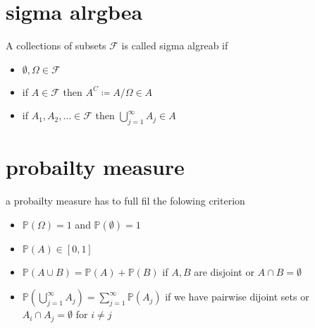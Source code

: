 \section{sigma alrgbea}
A collections of subsets $\mathcal{F}$ is called sigma algreab if
\begin{itemize}
	\item $\emptyset, \Omega \in \mathcal{F} $
	\item if $A \in \mathcal{F} $ then $A^C \coloneqq A / \Omega \in A$
	\item if $A_1 , A_2, \dots  \in \mathcal{F} $ then $ \bigcup_{j=1}^{\infty} A_j \in A$
\end{itemize}
\section{probailty measure}

a probailty measure has to full fil the folowing criterion 
\begin{itemize}
	\item $\mathbb{P}(\Omega) = 1$ and $\mathbb{P}(\emptyset) = 1$
	\item $\mathbb{P}(A) \in [0,1]$
	\item $\mathbb{P}(A \cup B) =\mathbb{P}(A) + \mathbb{P}(B) $ if $A, B$ are disjoint or $A\cap B = \emptyset$
	\item $\mathbb{P}(\bigcup_{j = 1}^{\infty} A_j) = \sum_{j=1}^{\infty} \mathbb{P}(A_j)$ if we have pairwise dijoint sets or $A_i \cap A_j = \emptyset$ for $i \neq j $
\end{itemize}